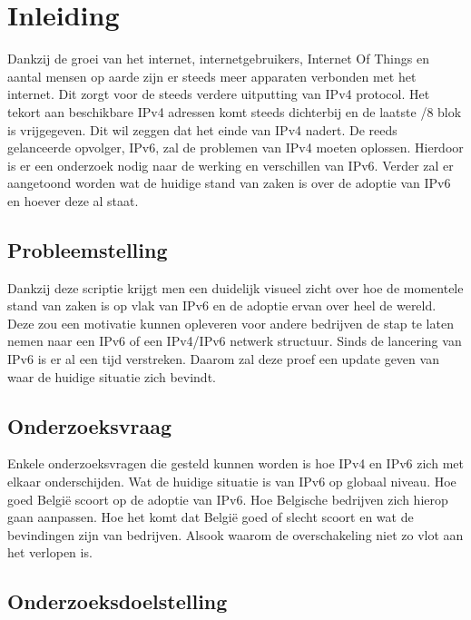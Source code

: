 
\chapter{Inleiding}
\label{ch:inleiding}

Dankzij de groei van het internet, internetgebruikers, Internet Of Things en aantal mensen op aarde zijn er steeds meer apparaten verbonden met het internet. Dit zorgt voor de steeds verdere uitputting van IPv4 protocol. Het tekort aan beschikbare IPv4 adressen komt steeds dichterbij en de laatste /8 blok is vrijgegeven. Dit wil zeggen dat het einde van IPv4 nadert. De reeds gelanceerde opvolger, IPv6, zal de problemen van IPv4 moeten oplossen. Hierdoor is er een onderzoek nodig naar de werking en verschillen van IPv6. Verder zal er aangetoond worden wat de huidige stand van zaken is over de adoptie van IPv6 en hoever deze al staat.

\section{Probleemstelling}
\label{sec:probleemstelling}

Dankzij deze scriptie krijgt men een duidelijk visueel zicht over hoe de momentele stand van zaken is op vlak van IPv6 en de adoptie ervan over heel de wereld. Deze zou een motivatie kunnen opleveren voor andere bedrijven de stap te laten nemen naar een IPv6 of een IPv4/IPv6 netwerk structuur. Sinds de lancering van IPv6 is er al een tijd verstreken. Daarom zal deze proef een update geven van waar de huidige situatie zich bevindt.

\section{Onderzoeksvraag}
\label{sec:onderzoeksvraag}

Enkele onderzoeksvragen die gesteld kunnen worden is hoe IPv4 en IPv6 zich met elkaar onderschijden. Wat de huidige situatie is van IPv6 op globaal niveau. Hoe goed België scoort op de adoptie van IPv6. Hoe Belgische bedrijven zich hierop gaan aanpassen. Hoe het komt dat België goed of slecht scoort en wat de bevindingen zijn van bedrijven. Alsook waarom de overschakeling niet zo vlot aan het verlopen is.

\section{Onderzoeksdoelstelling}
\label{sec:onderzoeksdoelstelling}

